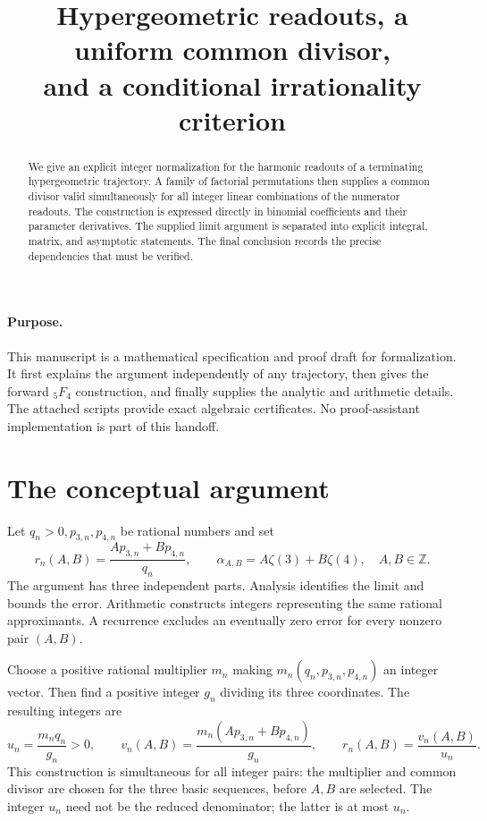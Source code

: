 \documentclass[11pt]{article}
\title{Hypergeometric readouts, a uniform common divisor,\\and a conditional irrationality criterion}
\author{}\date{}
\newcommand{\Z}{\mathbb Z}
\begin{document}
\maketitle

\begin{abstract}
We give an explicit integer normalization for the harmonic readouts of
 a terminating hypergeometric trajectory. A family of factorial
permutations then supplies a common divisor valid simultaneously for
all integer linear combinations of the numerator readouts. The
construction is expressed directly in binomial coefficients and their
parameter derivatives. The supplied limit argument is separated into explicit integral,
matrix, and asymptotic statements. The final conclusion records the
precise dependencies that must be verified.
\end{abstract}

\paragraph{Purpose.}
This manuscript is a mathematical specification and proof draft for
formalization. It first explains the argument independently of any
trajectory, then gives the forward ${}_5F_4$ construction, and finally
supplies the analytic and arithmetic details. The attached scripts
provide exact algebraic certificates. No proof-assistant implementation
is part of this handoff.

\section{The conceptual argument}
Let $q_n>0,p_{3,n},p_{4,n}$ be rational numbers and set
\[
 r_n(A,B)=\frac{Ap_{3,n}+Bp_{4,n}}{q_n},\qquad
 \alpha_{A,B}=A\zeta(3)+B\zeta(4),\quad A,B\in\Z.
\]
The argument has three independent parts. Analysis identifies the limit
and bounds the error. Arithmetic constructs integers representing the
same rational approximants. A recurrence excludes an eventually zero
error for every nonzero pair $(A,B)$.

Choose a positive rational multiplier $m_n$ making
$m_n(q_n,p_{3,n},p_{4,n})$ an integer vector. Then find a positive integer
$g_n$ dividing its three coordinates. The resulting integers are
\[
 u_n=\frac{m_nq_n}{g_n}>0,\qquad
 v_n(A,B)=\frac{m_n(Ap_{3,n}+Bp_{4,n})}{g_n},\qquad
 r_n(A,B)=\frac{v_n(A,B)}{u_n}.
\]
This construction is simultaneous for all integer pairs: the multiplier
and common divisor are chosen for the three basic sequences, before
$A,B$ are selected. The integer $u_n$ need not be the reduced denominator;
the latter is at most $u_n$.
\end{document}

